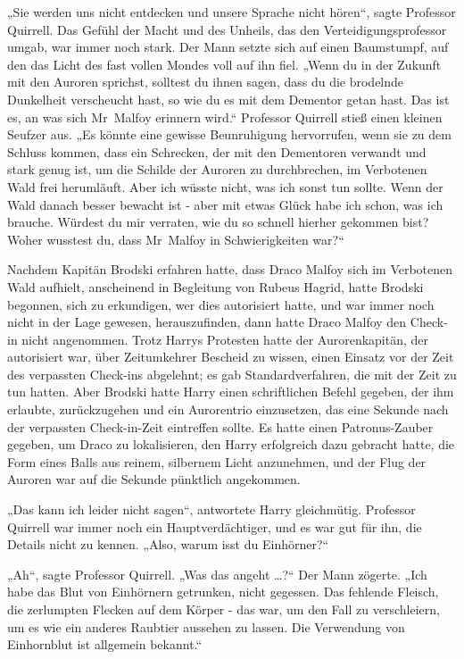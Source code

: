 {„Sie werden uns nicht entdecken und unsere Sprache nicht hören“, sagte Professor Quirrell. Das Gefühl der Macht und des Unheils, das den Verteidigungsprofessor umgab, war immer noch stark. Der Mann setzte sich auf einen Baumstumpf, auf den das Licht des fast vollen Mondes voll auf ihn fiel. „Wenn du in der Zukunft mit den Auroren sprichst, solltest du ihnen sagen, dass du die brodelnde Dunkelheit verscheucht hast, so wie du es mit dem Dementor getan hast. Das ist es, an was sich Mr~Malfoy erinnern wird.“ Professor Quirrell stieß einen kleinen Seufzer aus. „Es könnte eine gewisse Beunruhigung hervorrufen, wenn sie zu dem Schluss kommen, dass ein Schrecken, der mit den Dementoren verwandt und stark genug ist, um die Schilde der Auroren zu durchbrechen, im Verbotenen Wald frei herumläuft. Aber ich wüsste nicht, was ich sonst tun sollte. Wenn der Wald danach besser bewacht ist - aber mit etwas Glück habe ich schon, was ich brauche. Würdest du mir verraten, wie du so schnell hierher gekommen bist? Woher wusstest du, dass Mr~Malfoy in Schwierigkeiten war?“

Nachdem Kapitän Brodski erfahren hatte, dass Draco Malfoy sich im Verbotenen Wald aufhielt, anscheinend in Begleitung von Rubeus Hagrid, hatte Brodski begonnen, sich zu erkundigen, wer dies autorisiert hatte, und war immer noch nicht in der Lage gewesen, herauszufinden, dann hatte Draco Malfoy den Check-in nicht angenommen. Trotz Harrys Protesten hatte der Aurorenkapitän, der autorisiert war, über Zeitumkehrer Bescheid zu wissen, einen Einsatz vor der Zeit des verpassten Check-ins abgelehnt; es gab Standardverfahren, die mit der Zeit zu tun hatten. Aber Brodski hatte Harry einen schriftlichen Befehl gegeben, der ihm erlaubte, zurückzugehen und ein Aurorentrio einzusetzen, das eine Sekunde nach der verpassten Check-in-Zeit eintreffen sollte. Es hatte einen Patronus-Zauber gegeben, um Draco zu lokalisieren, den Harry erfolgreich dazu gebracht hatte, die Form eines Balls aus reinem, silbernem Licht anzunehmen, und der Flug der Auroren war auf die Sekunde pünktlich angekommen.

„Das kann ich leider nicht sagen“, antwortete Harry gleichmütig. Professor Quirrell war immer noch ein Hauptverdächtiger, und es war gut für ihn, die Details nicht zu kennen. „Also, warum isst du Einhörner?“

„Ah“, sagte Professor Quirrell. „Was das angeht …?“ Der Mann zögerte. „Ich habe das Blut von Einhörnern getrunken, nicht gegessen. Das fehlende Fleisch, die zerlumpten Flecken auf dem Körper - das war, um den Fall zu verschleiern, um es wie ein anderes Raubtier aussehen zu lassen. Die Verwendung von Einhornblut ist allgemein bekannt.“

}
